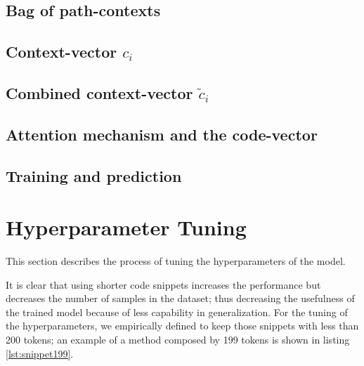 


\subsection{Bag of path-contexts}

\subsection{Context-vector $c_i$}

\subsection{Combined context-vector $\widetilde{c}_i$}

\subsection{Attention mechanism and the code-vector}

\subsection{Training and prediction}






\section{Hyperparameter Tuning}

This section describes the process of tuning the hyperparameters of the model.

It is clear that using shorter code snippets increases the performance but decreases the number of samples in the dataset; thus decreasing the usefulness of the trained model because of less capability in generalization.
For the tuning of the hyperparameters, we empirically defined to keep those snippets with less than 200 tokens; an example of a method composed by 199 tokens is shown in listing \ref{lst:snippet199}.

